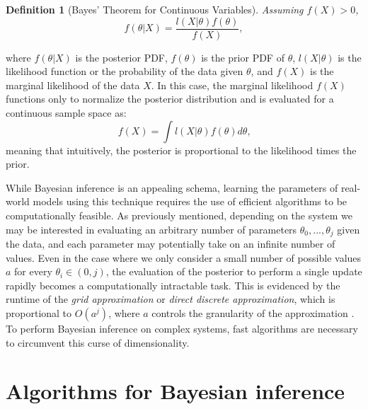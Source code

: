 \documentclass[
  12pt,
  oneside]{book}
\theoremstyle{definition}
\newtheorem{definition}{Definition}[chapter]
\theoremstyle{definition}
\theoremstyle{definition}
\theoremstyle{remark}
\begin{document}
\begin{definition}[Bayes' Theorem for Continuous Variables]
\protect\hypertarget{def:bayesprob}{}{\label{def:bayesprob} {} }\emph{Assuming \(f(X)>0\),}
\[f(\theta|X)=\frac{l(X|\theta)f(\theta)}{f(X)},\]
\end{definition}
where \(f(\theta|X)\) is the posterior PDF, \(f(\theta)\) is the prior PDF of \(\theta\), \(l(X|\theta)\) is the likelihood function or the probability of the data given \(\theta\), and \(f(X)\) is the marginal likelihood of the data \(X\).
In this case, the marginal likelihood \(f(X)\) functions only to normalize the posterior distribution and is evaluated for a continuous sample space as:
\[f(X)=\int l(X|\theta)f(\theta)d\theta \textrm{,}\]
meaning that intuitively, the posterior is proportional to the likelihood times the prior.

While Bayesian inference is an appealing schema, learning the parameters of real-world models using this technique requires the use of efficient algorithms to be computationally feasible.
As previously mentioned, depending on the system we may be interested in evaluating an arbitrary number of parameters \(\theta_0, ..., \theta_j\) given the data, and each parameter may potentially take on an infinite number of values.
Even in the case where we only consider a small number of possible values \(a\) for every \(\theta_i \in (0,j)\), the evaluation of the posterior to perform a single update rapidly becomes a computationally intractable task.
This is evidenced by the runtime of the \emph{grid approximation} or \emph{direct discrete approximation}, which is proportional to \(O(a^{j})\), where \(a\) controls the granularity of the approximation \citep[  10.1]{Gelman2013}.
To perform Bayesian inference on complex systems, fast algorithms are necessary to circumvent this curse of dimensionality.

\hypertarget{algorithms-for-bayesian-inference}{%
\chapter{Algorithms for Bayesian inference}\label{algorithms-for-bayesian-inference}}
\end{document}
